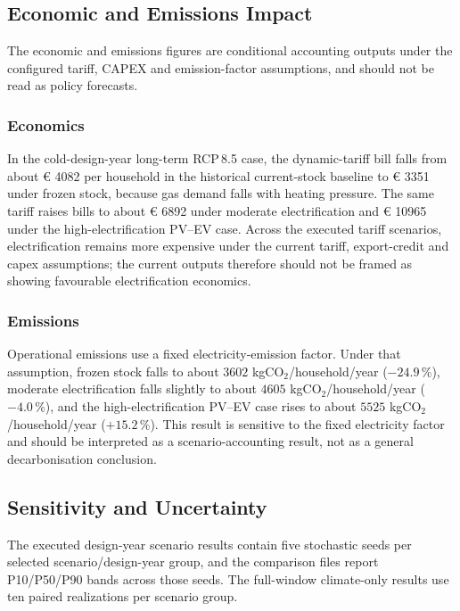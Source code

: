 \subsection{Economic and Emissions Impact}
\label{sec:economicImpact}

The economic and emissions figures are conditional accounting outputs under the configured tariff, CAPEX and emission-factor assumptions, and should not be read as policy forecasts. 

\subsubsection*{Economics}
In the cold-design-year long-term RCP\,8.5 case, the dynamic-tariff bill falls from about € 4082 per household in the historical current-stock baseline to € 3351 under frozen stock, because gas demand falls with heating pressure. The same tariff raises bills to about € 6892 under moderate electrification and € 10965 under the high-electrification PV--EV case. Across the executed tariff scenarios, electrification remains more expensive under the current tariff, export-credit and capex assumptions; the current outputs therefore should not be framed as showing favourable electrification economics.

\subsubsection*{Emissions}
Operational emissions use a fixed electricity-emission factor. Under that assumption, frozen stock falls to about $3602$ kgCO$_2$/household/year ($-24.9\,\%$), moderate electrification falls slightly to about $4605$ kgCO$_2$/household/year ($-4.0\,\%$), and the high-electrification PV--EV case rises to about $5525$ kgCO$_2$/household/year ($+15.2\,\%$). This result is sensitive to the fixed electricity factor and should be interpreted as a scenario-accounting result, not as a general decarbonisation conclusion.


\subsection{Sensitivity and Uncertainty}
\label{sec:sensitivityStochasticRobustness}

The executed design-year scenario results contain five stochastic seeds per selected scenario/design-year group, and the comparison files report P10/P50/P90 bands across those seeds. The full-window climate-only results use ten paired realizations per scenario group.

